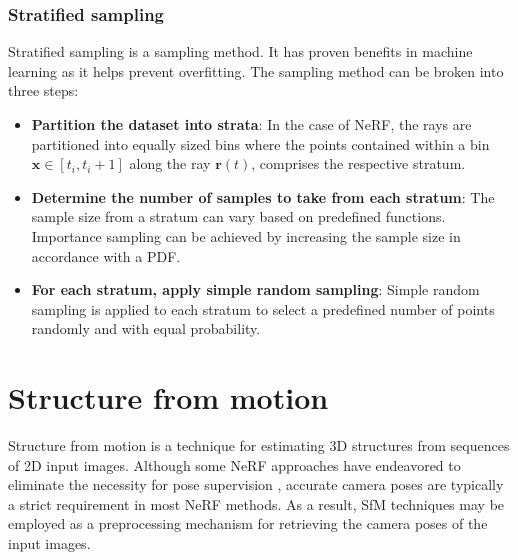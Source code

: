 
\subsubsection{Stratified sampling} \label{sec:stratifiedsampling}
Stratified sampling is a sampling method. It has proven benefits in machine learning as it helps prevent overfitting. The sampling method can be broken into three steps:

\begin{itemize}
    \item \textbf{Partition the dataset into strata}: In the case of NeRF, the rays are partitioned into equally sized bins where the points contained within a bin $\pmb{x} \in [t_i, t_i+1]$ along the ray $\pmb{r}(t)$, comprises the respective stratum.
    \item \textbf{Determine the number of samples to take from each stratum}: The sample size from a stratum can vary based on predefined functions. Importance sampling can be achieved by increasing the sample size in accordance with a PDF.
    \item \textbf{For each stratum, apply simple random sampling}: Simple random sampling is applied to each stratum to select a predefined number of points randomly and with equal probability.
\end{itemize}




\section{Structure from motion} \label{sec:sfm}
Structure from motion is a technique for estimating 3D structures from sequences of 2D input images. Although some NeRF approaches have  endeavored to eliminate the necessity for pose supervision \cite{lin_barf_2021}\cite{wang_nerf--_2022}, accurate camera poses are typically a strict requirement in most NeRF methods. As a result, SfM techniques may be employed as a preprocessing mechanism for retrieving the camera poses of the input images.


